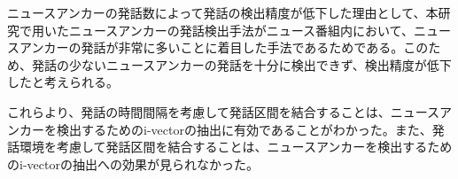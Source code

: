 ニュースアンカーの発話数によって発話の検出精度が低下した理由として、本研究で用いたニュースアンカーの発話検出手法がニュース番組内において、ニュースアンカーの発話が非常に多いことに着目した手法であるためである。このため、発話の少ないニュースアンカーの発話を十分に検出できず、検出精度が低下したと考えられる。\par

これらより、発話の時間間隔を考慮して発話区間を結合することは、ニュースアンカーを検出するためのi-vectorの抽出に有効であることがわかった。また、発話環境を考慮して発話区間を結合することは、ニュースアンカーを検出するためのi-vectorの抽出への効果が見られなかった。



\begin{comment}
本稿では、ニュース番組音声のインデクス自動付与に向けたダイアライゼーション実現のために、発話間隔と発話環境を考慮したi-vectorを用いたニュースアンカーの発話検出精度向上を目指した。\par
特定話者の識別にはi-vectorが一般的に用いられるが、短い発話からは話者の識別に必要な十分な話者の特徴を抽出できない。そのため、本稿では前後の発話区間が同一話者の発話である可能性が高いとき発話区間を結合し、長い発話を擬似的に作成した。次に、結合した発話区間からi-vectorを抽出することで短い発話から得られるi-vectorの抽出精度向上を目指した。発話区間の結合には、同一話者が連続で発話する場合間をおかずに発話すること、話者が切り替わった時に発話環境が変化することに着目し、発話と発話の時間間隔を考慮する手法と、発話者の発話環境を考慮する手法を用いた。以上の手法を用いて結合した発話区間から抽出したi-vectorを用いてニュースアンカーの発話検出を行った結果、発話検出精度が約6\%向上し、ニュースアンカーの発話検出への有意性を示した。しかし、ニュースアンカーの発話数が少ないニュース番組においてはアンカーの検出精度が著しく低下した。このため、ニュースアンカーの発話が少ない場合においても発話を検出する手法を提案する必要がある。\par
また、本研究で抽出したi-vectorを用いてニュースアンカーの音声認識を行なった。音声認識はニュースアンカーの発話区間が既知の場合と未知の場合で行い、発話区間が既知のときは音声認識精度の向上が確認できなかった。ニュースアンカーの発話区間が未知の場合、従来と比較してニュースアンカーの発話区間検出精度が向上したことが音声認識精度の向上に繋がった。\par
今後の課題として、ニュースアンカーの発話が少ない番組におけるニュースアンカーの発話検出精度の向上が必要である。これは、発話内容などi-vector以外のニュースアンカーの特徴を考慮する必要があると考えられる。また、音声認識においては、ニュース音声の背景雑音の除去、雑音に頑健な音響モデルの作成が挙げられる。ニュースアンカーはスタジオで発話しているため基本的には音声以外は入らないが、参考映像などの音が発話中に流れることがある。そのため、雑音、音楽に対して音源分離による雑音除去や、雑音や音楽が含まれた学習データを用いて音響モデルを学習することで、音声認識精度が向上すると考えられる。
\end{comment}
